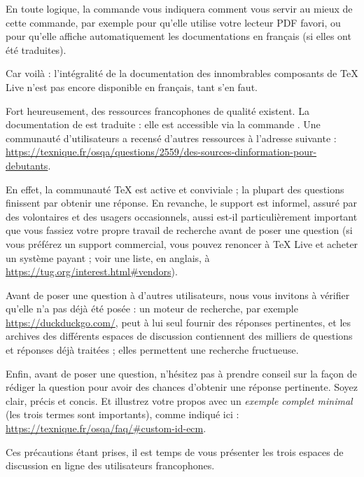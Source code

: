 \documentclass[german, english, french]{article}
\renewcommand{\TL}{\TeX{} Live\xspace}%
\begin{document}
En toute logique, la commande  vous indiquera comment vous
servir au mieux de cette commande, par exemple pour qu'elle utilise votre
lecteur PDF favori, ou pour qu'elle affiche automatiquement les documentations
en français (si elles ont été traduites).

Car voilà : l'intégralité de la documentation des innombrables composants de
\TL{} n'est pas encore disponible en français, tant s'en faut.

Fort heureusement, des ressources francophones de qualité existent.  La
documentation de \LaTeXe{} est traduite : elle est accessible via la commande
. Une communauté d'utilisateurs a recensé d'autres
ressources à l'adresse suivante :
\url{https://texnique.fr/osqa/questions/2559/des-sources-dinformation-pour-debutants}.

En effet, la communauté \TeX{} est active et conviviale ; la plupart des
questions finissent par obtenir une réponse. En revanche, le support est
informel, assuré par des volontaires et des usagers occasionnels, aussi est-il
particulièrement important que vous fassiez votre propre travail de recherche
avant de poser une question (si vous préférez un support commercial, vous pouvez
renoncer à \TL{} et acheter un système payant ; voir une liste, en anglais,
à \url{https://tug.org/interest.html#vendors}).

Avant de poser une question à d'autres utilisateurs, nous vous invitons
à vérifier qu'elle n'a pas déjà été posée : un moteur de recherche, par exemple
\url{https://duckduckgo.com/}, peut à lui seul fournir des réponses pertinentes,
et les archives des différents espaces de discussion contiennent des milliers de
questions et réponses déjà traitées ; elles permettent une recherche fructueuse.

Enfin, avant de poser une question, n'hésitez pas à prendre conseil sur la façon
de rédiger la question pour avoir des chances d'obtenir une réponse pertinente.
Soyez clair, précis et concis. Et illustrez votre propos avec un \emph{exemple
  complet minimal} (les trois termes sont importants), comme indiqué ici :
\url{https://texnique.fr/osqa/faq/#custom-id-ecm}.

Ces précautions étant prises, il est temps de vous présenter les trois espaces
de discussion en ligne des utilisateurs francophones.
\end{document}
